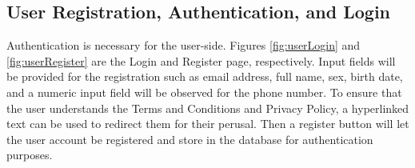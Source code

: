 \subsection{User Registration, Authentication, and Login}
Authentication is necessary for the user-side. Figures \ref{fig:userLogin} and \ref{fig:userRegister} are the Login and Register page, respectively. Input fields will be provided for the registration such as email address, full name, sex, birth date, and a numeric input field will be observed for the phone number. To ensure that the user understands the Terms and Conditions and Privacy Policy, a hyperlinked text can be used to redirect them for their perusal. Then a register button will let the user account be registered and store in the database for authentication purposes.
\begin{figure}[!h]
    \centering
    \begin{minipage}[c]{0.50\linewidth}
        \centering

\end{minipage}
\end{figure}
